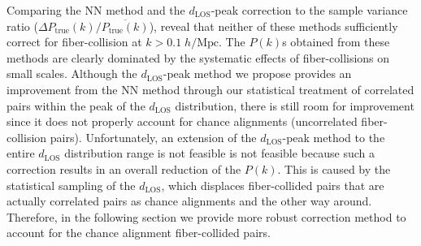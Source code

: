 \documentclass{emulateapj}
\begin{document}
Comparing the NN method and the $d_\mathrm{LOS}$-peak correction to the sample variance ratio ($\Delta P_\mathrm{true}(k) / \overline{P_\mathrm{true}(k)}$), reveal that neither of these methods sufficiently correct for fiber-collision at $k > 0.1\; h/\mathrm{Mpc}$. The $P(k)$s obtained from these methods are clearly dominated by the systematic effects of fiber-collisions on small scales. Although the $d_\mathrm{LOS}$-peak method we propose provides an improvement from the NN method through our statistical treatment of correlated pairs within the peak of the $d_\mathrm{LOS}$ distribution, there is still room for improvement since it does not properly account for chance alignments (uncorrelated fiber-collision pairs). Unfortunately, an extension of the $d_\mathrm{LOS}$-peak method to the entire $d_\mathrm{LOS}$ distribution range is not feasible is not feasible because such a correction results in an overall reduction of the $P(k)$. This is caused by the statistical sampling of the $d_\mathrm{LOS}$, which displaces fiber-collided pairs that are actually correlated pairs as chance alignments and the other way around. Therefore, in the following section we provide more robust correction method to account for the chance alignment fiber-collided pairs. 
\end{document}

